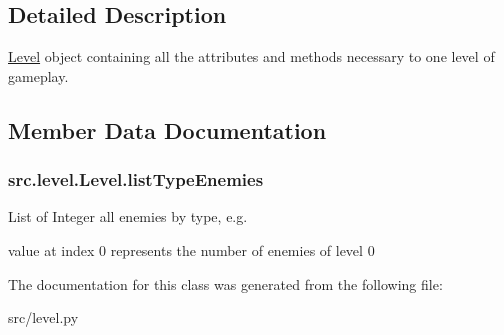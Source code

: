 \subsection{Detailed Description}
\hyperlink{classsrc_1_1level_1_1_level}{Level} object containing all the attributes and methods necessary to one level of gameplay. 

\subsection{Member Data Documentation}
\hypertarget{classsrc_1_1level_1_1_level_a198d86791a4f4a570909d80490057ae9}{}
\subsubsection[{list\+Type\+Enemies}]{\setlength{\rightskip}{0pt plus 5cm}src.\+level.\+Level.\+list\+Type\+Enemies}\label{classsrc_1_1level_1_1_level_a198d86791a4f4a570909d80490057ae9}


List of Integer all enemies by type, e.\+g. 

value at index 0 represents the number of enemies of level 0 

The documentation for this class was generated from the following file\+:\begin{DoxyCompactItemize}
\item 
src/level.\+py\end{DoxyCompactItemize}
